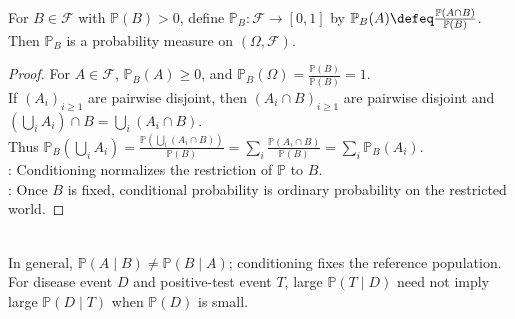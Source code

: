 \begin{proposition} \label{prop:conditional-probability-is-probability-measure} \\
For $B\in\mathcal{F}$ with $\mathbb{P}(B)>0$, define $\mathbb{P}_B:\mathcal{F}\to[0,1]$ by $\mathbb{P}_B(A)\defeq\frac{\mathbb{P}(A\cap B)}{\mathbb{P}(B)}$.\\
Then $\mathbb{P}_B$ is a probability measure on $(\Omega,\mathcal{F})$.
\begin{proof} For $A\in\mathcal{F}$, $\mathbb{P}_B(A)\geq0$, and $\mathbb{P}_B(\Omega)=\frac{\mathbb{P}(B)}{\mathbb{P}(B)}=1$.\\
If $(A_i)_{i\geq1}$ are pairwise disjoint, then $(A_i\cap B)_{i\geq1}$ are pairwise disjoint and $(\bigcup\limits_i A_i)\cap B=\bigcup\limits_i(A_i\cap B)$.\\
Thus $\mathbb{P}_B(\bigcup\limits_i A_i)=\frac{\mathbb{P}(\bigcup\limits_i(A_i\cap B))}{\mathbb{P}(B)}=\sum\limits_i\frac{\mathbb{P}(A_i\cap B)}{\mathbb{P}(B)}=\sum\limits_i\mathbb{P}_B(A_i)$.\\
: Conditioning normalizes the restriction of $\mathbb{P}$ to $B$.\\
: Once $B$ is fixed, conditional probability is ordinary probability on the restricted world.
\end{proof}
\end{proposition}

\begin{remark} \label{rem:conditional-probability-not-symmetric} \\
In general, $\mathbb{P}(A\mid B)\neq\mathbb{P}(B\mid A)$; conditioning fixes the reference population. For disease event $D$ and positive-test event $T$, large $\mathbb{P}(T\mid D)$ need not imply large $\mathbb{P}(D\mid T)$ when $\mathbb{P}(D)$ is small.
\end{remark}

